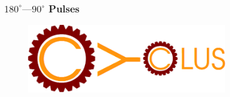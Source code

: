 \begin{frame}
  \frametitle{$180^{\circ}—90^{\circ}$ Pulses}
        \begin{center}
                \begin{figure}
                \begin{center}
                        \includegraphics[height=3cm]{./images/cyclus.png}
                \end{center}
                \caption{}
                \label{fig:cyclus}
                \end{figure}
        \end{center}
\end{frame}

